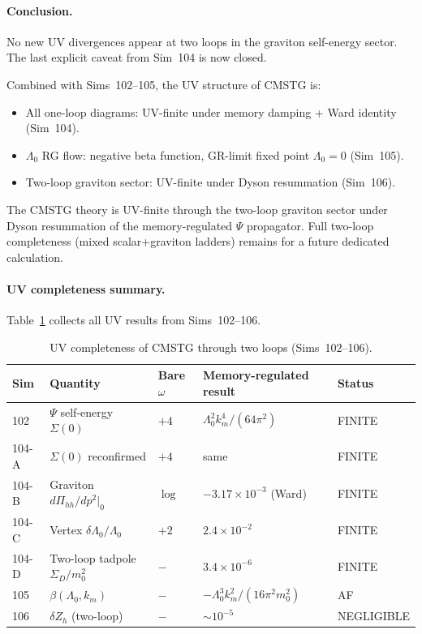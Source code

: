 \documentclass[12pt,a4paper]{article}
\begin{document}
\paragraph{Conclusion.}
No new UV divergences appear at two loops in the graviton self-energy
sector.  The last explicit caveat from Sim~104 is now closed.

Combined with Sims~102--105, the UV structure of CMSTG is:
\begin{itemize}
\item All one-loop diagrams: UV-finite under memory damping + Ward identity (Sim~104).
\item $\Lambda_0$ RG flow: negative beta function, GR-limit fixed point $\Lambda_0=0$ (Sim~105).
\item Two-loop graviton sector: UV-finite under Dyson resummation (Sim~106).
\end{itemize}
The CMSTG theory is UV-finite through the two-loop graviton sector under
Dyson resummation of the memory-regulated $\Psi$ propagator.
Full two-loop completeness (mixed scalar+graviton ladders) remains for
a future dedicated calculation.

\paragraph{UV completeness summary.}
Table~\ref{tab:uv_summary} collects all UV results from Sims~102--106.

\begin{table}[h]
\centering
\caption{UV completeness of CMSTG through two loops (Sims~102--106).}
\label{tab:uv_summary}
\begin{tabular}{lllll}
\toprule
Sim & Quantity & Bare $\omega$ & Memory-regulated result & Status \\
\midrule
102       & $\Psi$ self-energy $\Sigma(0)$ & $+4$ & $\Lambda_0^2 k_m^4/(64\pi^2)$ & FINITE \\
104-A     & $\Sigma(0)$ reconfirmed        & $+4$ & same                          & FINITE \\
104-B     & Graviton $d\Pi_{hh}/dp^2|_0$  & $\log$ & $-3.17\times10^{-3}$ (Ward) & FINITE \\
104-C     & Vertex $\delta\Lambda_0/\Lambda_0$ & $+2$ & $2.4\times10^{-2}$      & FINITE \\
104-D     & Two-loop tadpole $\Sigma_D/m_0^2$ & $-$ & $3.4\times10^{-6}$        & FINITE \\
105       & $\beta(\Lambda_0,k_m)$         & $-$ & $-\Lambda_0^3 k_m^2/(16\pi^2 m_0^2)$ & AF \\
106       & $\delta Z_h$ (two-loop)        & $-$ & $\sim10^{-5}$               & NEGLIGIBLE \\
\bottomrule
\end{tabular}
\end{table}
\end{document}
